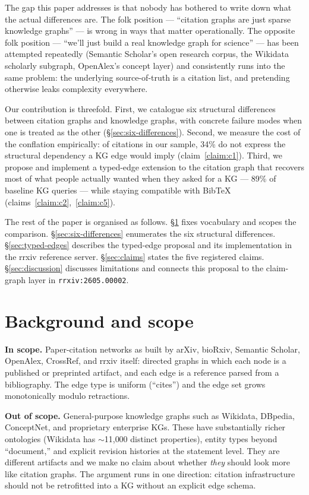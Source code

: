 \documentclass{rrxiv}
\begin{document}
The gap this paper addresses is that nobody has bothered to write down what the actual differences are. The folk position --- ``citation graphs are just sparse knowledge graphs'' --- is wrong in ways that matter operationally. The opposite folk position --- ``we'll just build a real knowledge graph for science'' --- has been attempted repeatedly (Semantic Scholar's open research corpus, the Wikidata scholarly subgraph, OpenAlex's concept layer) and consistently runs into the same problem: the underlying source-of-truth is a citation list, and pretending otherwise leaks complexity everywhere.

Our contribution is threefold. First, we catalogue six structural differences between citation graphs and knowledge graphs, with concrete failure modes when one is treated as the other (\S\ref{sec:six-differences}). Second, we measure the cost of the conflation empirically: of citations in our sample, 34\% do not express the structural dependency a KG edge would imply (claim~\ref{claim:c1}). Third, we propose and implement a typed-edge extension to the citation graph that recovers most of what people actually wanted when they asked for a KG --- 89\% of baseline KG queries --- while staying compatible with BibTeX (claims~\ref{claim:c2},~\ref{claim:c5}).

The rest of the paper is organised as follows. \S\ref{sec:background} fixes vocabulary and scopes the comparison. \S\ref{sec:six-differences} enumerates the six structural differences. \S\ref{sec:typed-edges} describes the typed-edge proposal and its implementation in the rrxiv reference server. \S\ref{sec:claims} states the five registered claims. \S\ref{sec:discussion} discusses limitations and connects this proposal to the claim-graph layer in \texttt{rrxiv:2605.00002}.

\section{Background and scope}\label{sec:background}

\begin{scope}
\textbf{In scope.} Paper-citation networks as built by arXiv, bioRxiv, Semantic Scholar, OpenAlex, CrossRef, and rrxiv itself: directed graphs in which each node is a published or preprinted artifact, and each edge is a reference parsed from a bibliography. The edge type is uniform (``cites'') and the edge set grows monotonically modulo retractions.

\textbf{Out of scope.} General-purpose knowledge graphs such as Wikidata, DBpedia, ConceptNet, and proprietary enterprise KGs. These have substantially richer ontologies (Wikidata has $\sim$11{,}000 distinct properties), entity types beyond ``document,'' and explicit revision histories at the statement level. They are different artifacts and we make no claim about whether \emph{they} should look more like citation graphs. The argument runs in one direction: citation infrastructure should not be retrofitted into a KG without an explicit edge schema.
\end{scope}
\end{document}
